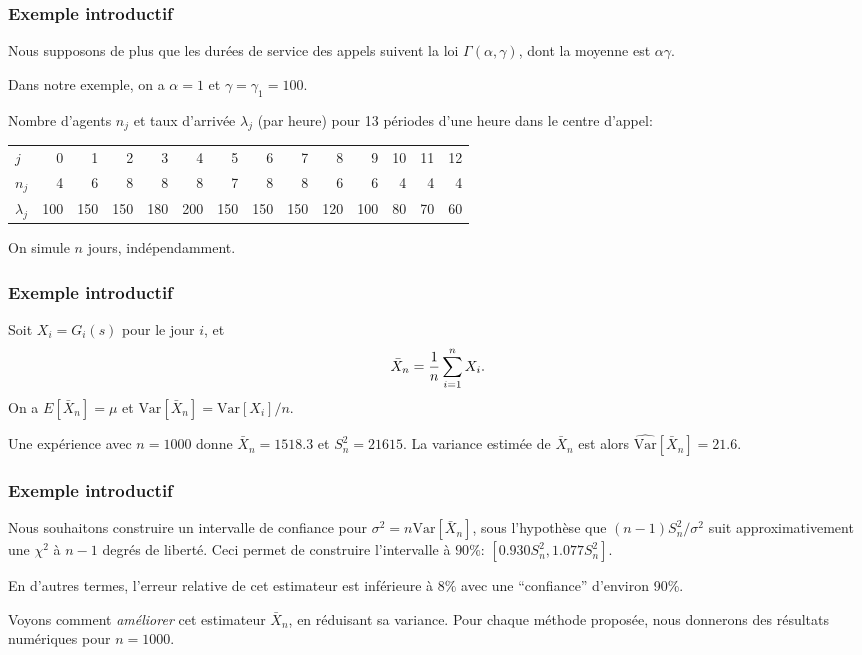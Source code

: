 \documentclass[t,usepdftitle=false]{beamer}
\def\Var{\mbox{Var}}
\begin{document}
\begin{frame}
\frametitle{Exemple introductif}

Nous supposons de plus que les durées de service des appels suivent la loi
$\Gamma(\alpha,\gamma)$, dont la moyenne est $\alpha\gamma$.

\mbox{}

Dans notre exemple, on a $\alpha = 1$ et $\gamma = {\gamma_1} = 100$.

\mbox{}

Nombre d'agents $n_j$ et taux d'arrivée $\lambda_j$ (par heure) pour 13 périodes d'une heure dans le centre d'appel:

\begin{footnotesize}
\hspace*{-1cm}
\begin{tabular}{l|rrrrrrrrrrrrr}
\hline
  $j$   & 0 & 1 & 2 & 3 & 4 & 5 & 6 & 7 & 8 & 9 & 10 & 11 & 12 \\
  $n_j$ & 4 & 6 & 8 & 8 & 8 & 7 & 8 & 8 & 6 &  6 &  4 &  4 &  4 \\
  $\lambda_j$ & 100 & 150 & 150 & 180 & 200 & 150 & 150 & 150 & 
                          120 & 100 & 80 & 70 & 60 \\
\hline
\end{tabular}
\end{footnotesize}

\mbox{}

On simule ${n}$ jours, indépendamment.

\end{frame}

\begin{frame}
\frametitle{Exemple introductif}

Soit ${X_i} = G_i(s)$ pour le jour $i$, et 
\[
  {\bar X_n} = {1\over n} \sum_{i=1}^n X_i.
\]
On a $E[\bar X_n] = \mu$ et $\Var[\bar X_n] = \Var[X_i]/n$.

\mbox{}

Une expérience avec ${n = 1000}$ donne $\bar X_n = 1518.3$ et $S_n^2
= {21615}$.
La variance estimée de $\bar X_n$ est alors $\widehat{\Var}[\bar X_n] = 21.6$.

\end{frame}

\begin{frame}
\frametitle{Exemple introductif}

Nous souhaitons construire un intervalle de confiance pour $\sigma^2 = n \Var[\bar X_n]$, sous
l'hypothèse que $(n-1)S_n^2/\sigma^2$ suit approximativement une $\chi^2$ à ${n-1}$ degrés de
liberté. Ceci permet de construire l'intervalle à $90\%$: $[0.930S_n^2, 1.077S_n^2]$.

\mbox{}

En d'autres termes, l'erreur relative de cet estimateur est inférieure \`a $8\%$ avec une
``confiance'' d'environ 90\%.

\mbox{}

Voyons comment \emph{améliorer} cet estimateur $\bar X_n$,
en réduisant sa variance. Pour chaque méthode proposée, 
nous donnerons des résultats numériques pour {$n = 1000$}.

\end{frame}
\end{document}
